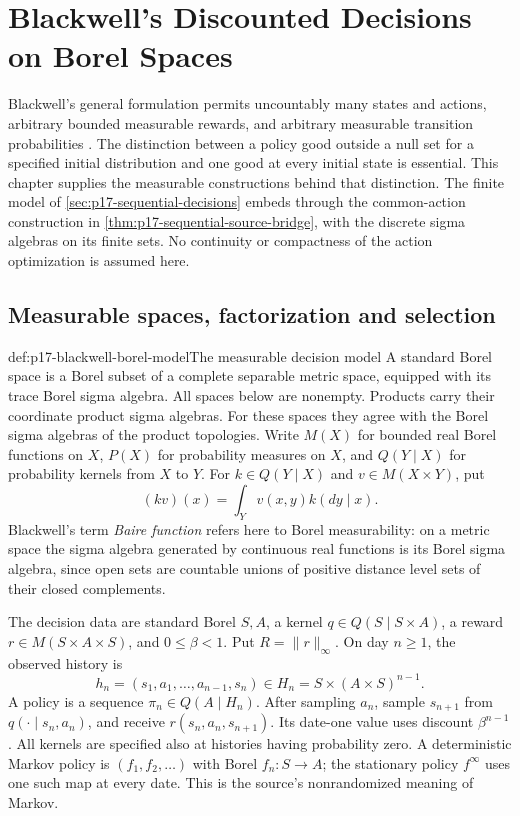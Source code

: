\chapter{Blackwell's Discounted Decisions on Borel Spaces}
\label{sec:p17-blackwell-general-discounted}

Blackwell's general formulation permits uncountably many states and actions,
arbitrary bounded measurable rewards, and arbitrary measurable transition
probabilities \cite[pp.~226--235]{Blackwell1965Discounted}.
The distinction between a policy good outside a null set for a specified
initial distribution and one good at every initial state is essential.
This chapter supplies the measurable constructions behind that distinction.
The finite model of \cref{sec:p17-sequential-decisions} embeds through
the common-action construction in \cref{thm:p17-sequential-source-bridge},
with the discrete sigma algebras on its finite sets.
No continuity or compactness of
the action optimization is assumed here.

\section{Measurable spaces, factorization and selection}

\begin{hbdefinition}{def:p17-blackwell-borel-model}{The measurable decision model}
A standard Borel space is a Borel subset of a complete separable metric
space, equipped with its trace Borel sigma algebra. All spaces below
are nonempty. Products carry their coordinate product sigma algebras.
For these spaces they agree with the Borel sigma algebras of the
product topologies. Write \(M(X)\) for bounded real Borel functions on \(X\),
\(P(X)\) for probability measures on \(X\), and \(Q(Y\mid X)\) for
probability kernels from \(X\) to \(Y\).
For \(k\in Q(Y\mid X)\) and \(v\in M(X\times Y)\), put
\[
 (kv)(x)=\int_Y v(x,y)k(dy\mid x).
\]
Blackwell's term \emph{Baire function} refers here to Borel measurability:
on a metric space the sigma algebra generated by continuous real
functions is its Borel sigma algebra, since open sets are countable
unions of positive distance level sets of their closed complements.

The decision data are standard Borel \(S,A\), a kernel
\(q\in Q(S\mid S\times A)\), a reward \(r\in M(S\times A\times S)\),
and \(0\leq\beta<1\). Put \(R=\|r\|_\infty\).
On day \(n\geq1\), the observed history is
\[
 h_n=(s_1,a_1,\ldots,a_{n-1},s_n)\in
 H_n=S\times(A\times S)^{n-1}.
\]
A policy is a sequence \(\pi_n\in Q(A\mid H_n)\).
After sampling \(a_n\), sample \(s_{n+1}\) from
\(q(\cdot\mid s_n,a_n)\), and receive \(r(s_n,a_n,s_{n+1})\).
Its date-one value uses discount \(\beta^{n-1}\).
All kernels are specified also at histories having probability zero.
A deterministic Markov policy is \((f_1,f_2,\ldots)\) with Borel
\(f_n:S\to A\); the stationary policy \(f^\infty\) uses one such map
at every date. This is the source's nonrandomized meaning of Markov.
\end{hbdefinition}

